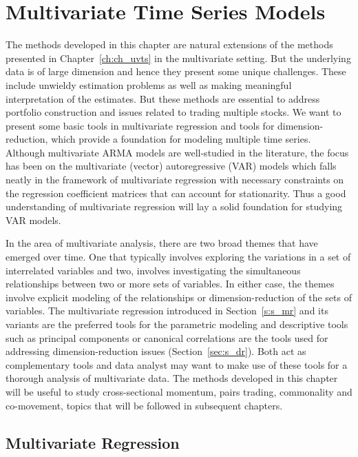 \chapter{Multivariate Time Series Models\label{ch:ch_mvts}}

The methods developed in this chapter are natural extensions of the methods presented in Chapter~\ref{ch:ch_uvts} in the multivariate setting. But the underlying data is of large dimension and hence they present some unique challenges. These include unwieldy estimation problems as well as making meaningful interpretation of the estimates. But these methods are essential to address portfolio construction and issues related to trading multiple stocks. We want to present some basic tools in multivariate regression and tools for dimension-reduction, which provide a foundation for modeling multiple time series. Although multivariate ARMA models are well-studied in the literature, the focus has been on the multivariate (vector) autoregressive (VAR) models which falls neatly in the framework of multivariate regression with necessary constraints on the regression coefficient matrices that can account for stationarity. Thus a good understanding of multivariate regression will lay a solid foundation for studying VAR models.


In the area of multivariate analysis, there are two broad themes that have emerged over time. One that typically involves exploring the variations in a set of interrelated variables and two, involves investigating the simultaneous relationships between two or more sets of variables. In either case, the themes involve explicit modeling of the relationships or dimension-reduction of the sets of variables. The multivariate regression introduced in Section~\ref{s:s_mr} and its variants are the preferred tools for the parametric modeling and descriptive tools such as principal components or canonical correlations are the tools used for addressing dimension-reduction issues (Section~\ref{sec:s_dr}). Both act as complementary tools and data analyst may want to make use of these tools for a thorough analysis of multivariate data. The methods developed in this chapter will be useful to study cross-sectional momentum, pairs trading, commonality and co-movement, topics that will be followed in subsequent chapters.



\section{Multivariate Regression \label{s:s_mr}} 

